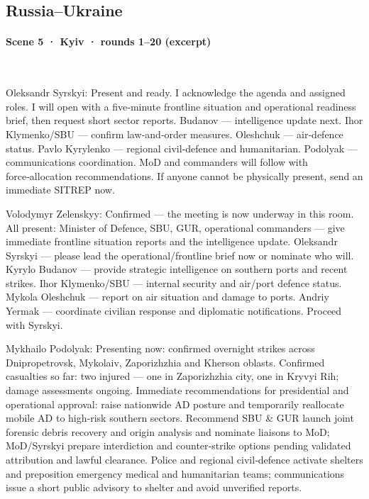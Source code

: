 \subsection*{Russia--Ukraine}
\paragraph{Scene 5 · Kyiv · rounds 1–20 (excerpt)}\mbox{}\\[2pt]
\begin{zhblock}\small\setlength{\parskip}{3pt}
Oleksandr Syrskyi:
Present and ready. I acknowledge the agenda and assigned roles.
I will open with a five‑minute frontline situation and operational readiness brief, then request short sector reports.
Budanov — intelligence update next. Ihor Klymenko/SBU — confirm law‑and‑order measures. Oleshchuk — air‑defence status. Pavlo Kyrylenko — regional civil‑defence and humanitarian. Podolyak — communications coordination.
MoD and commanders will follow with force‑allocation recommendations. If anyone cannot be physically present, send an immediate SITREP now.
\par Volodymyr Zelenskyy:
Confirmed — the meeting is now underway in this room.
All present: Minister of Defence, SBU, GUR, operational commanders — give immediate frontline situation reports and the intelligence update.
Oleksandr Syrskyi — please lead the operational/frontline brief now or nominate who will. Kyrylo Budanov — provide strategic intelligence on southern ports and recent strikes.
Ihor Klymenko/SBU — internal security and air/port defence status. Mykola Oleshchuk — report on air situation and damage to ports. Andriy Yermak — coordinate civilian response and diplomatic notifications. Proceed with Syrskyi.
\par Mykhailo Podolyak:
Presenting now: confirmed overnight strikes across Dnipropetrovsk, Mykolaiv, Zaporizhzhia and Kherson oblasts.
Confirmed casualties so far: two injured — one in Zaporizhzhia city, one in Kryvyi Rih; damage assessments ongoing.
Immediate recommendations for presidential and operational approval: raise nationwide AD posture and temporarily reallocate mobile AD to high‑risk southern sectors.
Recommend SBU \& GUR launch joint forensic debris recovery and origin analysis and nominate liaisons to MoD; MoD/Syrskyi prepare interdiction and counter‑strike options pending validated attribution and lawful clearance.
Police and regional civil‑defence activate shelters and preposition emergency medical and humanitarian teams; communications issue a short public advisory to shelter and avoid unverified reports.

\end{zhblock}

